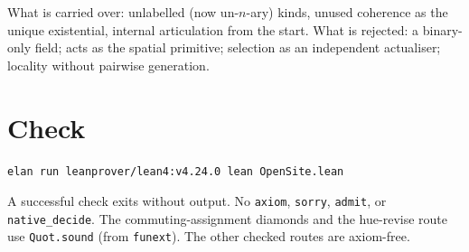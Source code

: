 \documentclass[11pt]{article}
\theoremstyle{definition}
\newcommand{\lean}[1]{\nolinkurl{#1}}
\begin{document}
What is carried over: unlabelled (now un-$n$-ary) kinds, unused
coherence as the unique existential, internal articulation from the
start. What is rejected: a binary-only field; acts as the spatial
primitive; selection as an independent actualiser; locality without
pairwise generation.

\section{Check}

\begin{verbatim}
elan run leanprover/lean4:v4.24.0 lean OpenSite.lean
\end{verbatim}

A successful check exits without output. No \texttt{axiom},
\texttt{sorry}, \texttt{admit}, or \texttt{native\_decide}. The
commuting-assignment diamonds and the hue-revise route use
\lean{Quot.sound} (from \texttt{funext}). The other checked routes are
axiom-free.
\end{document}
